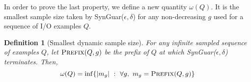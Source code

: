 \documentclass[11pt]{extarticle}
\newtheorem{theorem}{Theorem}[section]
\newtheorem{definition}{Definition}
\newcommand{\tool}{{\sc SynGuar}\xspace}
\begin{document}


In order to prove the last property, we define a new quantity $\omega(Q)$. It is the smallest sample size taken by \tool($\epsilon, \delta$) for any non-decreasing $g$ used for a sequence of I/O examples $Q$.

\begin{definition}[Smallest dynamic sample size]
    For any infinite sampled sequence of examples $Q$, let $\Call{Prefix}{Q,g}$ be the prefix of $Q$ at which \tool($\epsilon, \delta$) terminates. Then,  
    $$
    \omega(Q) = \inf \{ |m_g|~:~\forall g,\text{ } m_g = \Call{Prefix}{Q,g}\}
    $$
\end{definition}

\end{document}
